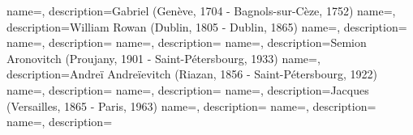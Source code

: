  {
    name=,
    description={Gabriel (Genève, 1704 - Bagnols-sur-Cèze, 1752)}
}
 {
    name=,
    description={William Rowan (Dublin, 1805 - Dublin, 1865)}
}
 {
    name=,
    description={}
}
 {
    name=,
    description={}
}
 {
    name=,
    description={}
}
 {
    name=,
    description={Semion Aronovitch (Proujany, 1901 - Saint-Pétersbourg, 1933)}
}
 {
    name=,
    description={Andreï Andreïevitch (Riazan, 1856 - Saint-Pétersbourg, 1922)}
}
 {
    name=,
    description={}
}
 {
    name=,
    description={}
}
 {
    name=,
    description={Jacques (Versailles, 1865 - Paris, 1963)}
}
 {
    name=,
    description={}
}
 {
    name=,
    description={}
}
 {
    name=,
    description={}
}

